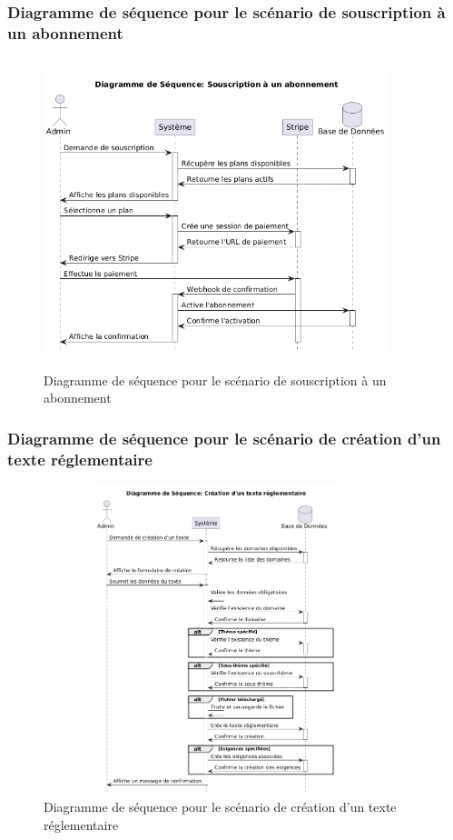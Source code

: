 \subsubsection{Diagramme de séquence pour le scénario de souscription à un abonnement}
\begin{figure}[H]
    \centering
    \includegraphics[width=10cm,height=9cm]{images/subscribeseq.png}
    \caption{Diagramme de séquence pour le scénario de souscription à un abonnement}
\end{figure}

\subsubsection{Diagramme de séquence pour le scénario de création d'un texte réglementaire}
\begin{figure}[H]
    \centering
    \includegraphics[width=10cm,height=9cm]{images/createtextseq.png}
    \caption{Diagramme de séquence pour le scénario de création d'un texte réglementaire}
\end{figure}

